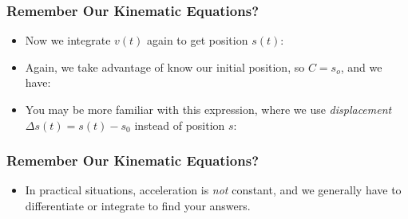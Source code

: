 \documentclass[12pt,compress,aspectratio=169]{beamer}
\begin{document}
\begin{frame}
  \frametitle{Remember Our Kinematic Equations?}
  \begin{itemize}
  \item Now we integrate $v(t)$ again to get position $s(t)$:
  \item Again, we take advantage of know our initial position, so $C=s_o$, and
    we have:
    
  \item You may be more familiar with this expression, where we use
    \emph{displacement} $\Delta s(t) = s(t)-s_0$ instead of position $s$:

  \end{itemize}
\end{frame}

\begin{frame}
  \frametitle{Remember Our Kinematic Equations?}
  \begin{itemize}
  \item In practical situations, acceleration is \emph{not} constant, and we
    generally have to differentiate or integrate to find your answers.
  \end{itemize}
\end{frame}
\end{document}
